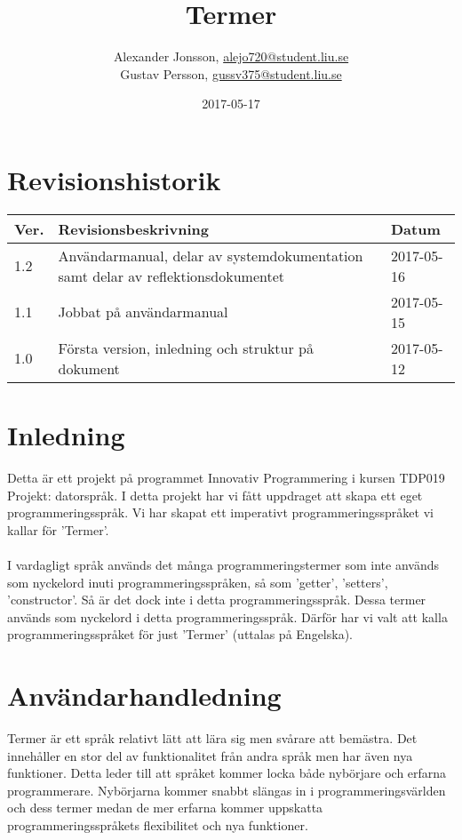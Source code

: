 \documentclass{TDP003mall}
\author{Alexander Jonsson, \url{alejo720@student.liu.se}\\
  Gustav Persson, \url{gussv375@student.liu.se}}
\title{Termer}
\date{2017-05-17}
\begin{document}
\projectpage

\tableofcontents

\section{Revisionshistorik}
\begin{table}[!h]
\begin{tabularx}{\linewidth}{|l|X|l|}
\hline
Ver. & Revisionsbeskrivning & Datum \\\hline
1.2 & Användarmanual, delar av systemdokumentation samt delar av reflektionsdokumentet & 2017-05-16 \\\hline
1.1 & Jobbat på användarmanual & 2017-05-15 \\\hline
1.0 & Första version, inledning och struktur på dokument & 2017-05-12 \\\hline
\end{tabularx}
\end{table}

\section{Inledning}
Detta är ett projekt på programmet Innovativ Programmering i kursen TDP019 Projekt: datorspråk. I detta projekt har vi fått uppdraget att skapa ett eget programmeringsspråk. Vi har skapat ett imperativt programmeringsspråket vi kallar för 'Termer'.
\\\\
I vardagligt språk används det många programmeringstermer som inte används som nyckelord inuti programmeringsspråken, så som 'getter', 'setters', 'constructor'. Så är det dock inte i detta programmeringsspråk. Dessa termer används som nyckelord i detta programmeringsspråk. Därför har vi valt att kalla programmeringsspråket för just 'Termer' (uttalas på Engelska).

\newpage

\section{Användarhandledning}
Termer är ett språk relativt lätt att lära sig men svårare att bemästra.
Det innehåller en stor del av funktionalitet från andra språk men har även nya funktioner. Detta leder till att språket kommer locka både nybörjare och erfarna programmerare. Nybörjarna kommer snabbt slängas in i programmeringsvärlden och dess termer medan de mer erfarna kommer uppskatta programmeringsspråkets flexibilitet och nya funktioner.
\end{document}
